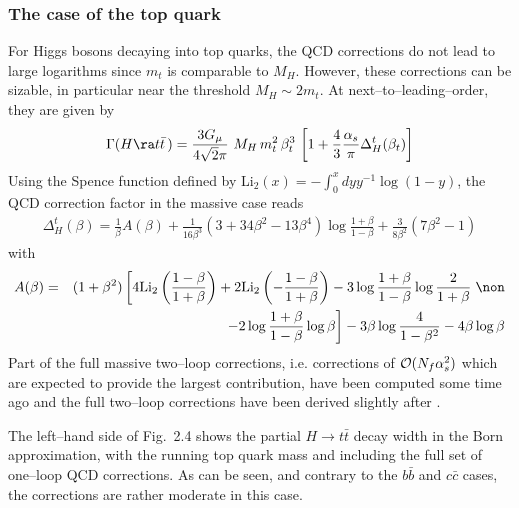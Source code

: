 \subsubsection{The case of the top quark}

For Higgs bosons decaying into top quarks, the QCD corrections do not lead to
large logarithms since $m_t$ is comparable to $M_H$. However, 
these corrections can be sizable, in particular near the threshold $M_H 
\sim 2m_t$. At next--to--leading--order, they are given by 
\begin{eqnarray}
\Gamma (H \ra t\bar{t}\,)= \frac{3 G_\mu}{4 \sqrt{2} \pi} \,
\, M_H \,  m_t^2 \, \beta_t^3 \, \left[ 1 +\frac{4}{3} \frac{\alpha_s}{\pi}
\Delta_H^t  (\beta_t) \right]
\end{eqnarray}
Using the Spence function defined by Li$_2(x)=  -\int_0^x dy y^{-1} \log(1-y)$,
the QCD correction factor in the massive case reads 
\cite{HqqQCD-1loop,Drees+Hikasa,AD+PG}
\begin{eqnarray}
\Delta_H^t(\beta) = \frac{1}{\beta}A(\beta) + \frac{1}{16\beta^3}(3+34\beta^2-
13 \beta^4)\log \frac{1+\beta}{1-\beta} +\frac{3}{8\beta^2}(7 \beta^2-1) 
\label{eq:dqcdmass}
\end{eqnarray}
with 
\begin{eqnarray}
A(\beta) &= & (1+\beta^2) \left[ 4 {\rm Li}_2 \left( \frac{1-\beta}{1+\beta}
\right) +2 {\rm Li}_2 \left( -\frac{1-\beta}{1+\beta} \right) -3 \log
\frac{1+\beta}{1-\beta} \log \frac{2}{1+\beta} \right. \non \\
& & \left. -2 \log \frac{1+\beta}{1-\beta} \log \beta \right] -
3 \beta \log \frac{4}{1-\beta^2} -4 \beta \log \beta 
\label{Abeta-tt}
\end{eqnarray}
Part of the full massive two--loop corrections, i.e. corrections  of ${\cal O}
(N_f \alpha_s^2)$ which are expected to provide the largest contribution, have 
been computed some time ago \cite{HqqQCD-massive1} and the full two--loop 
corrections have been derived slightly after \cite{HqqQCD-massive2}. \s

The left--hand side of Fig.~2.4 shows the partial $H \to t\bar{t}$ decay width
in the Born approximation, with the running top quark mass and including the
full set of one--loop QCD corrections. As can be seen, and contrary to the 
$b\bar b$ and $c\bar c$ cases, the corrections are rather moderate in
this case.\s

